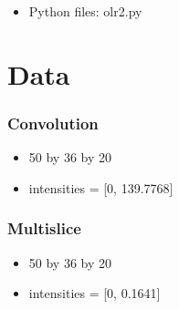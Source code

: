 \documentclass[11pt]{article}
\begin{document}
\begin{itemize}
\item Python files: olr2.py
\end{itemize}
\pagebreak
\section{Data}
\label{sec-2}
\subsubsection{Convolution}
\label{sec-2-0-1}
\begin{itemize}
\item 50 by 36 by 20
\item intensities = [0, 139.7768]
\end{itemize}

\subsubsection{Multislice}
\label{sec-2-0-2}
\begin{itemize}
\item 50 by 36 by 20
\item intensities = [0, 0.1641]
\end{itemize}
\end{document}
